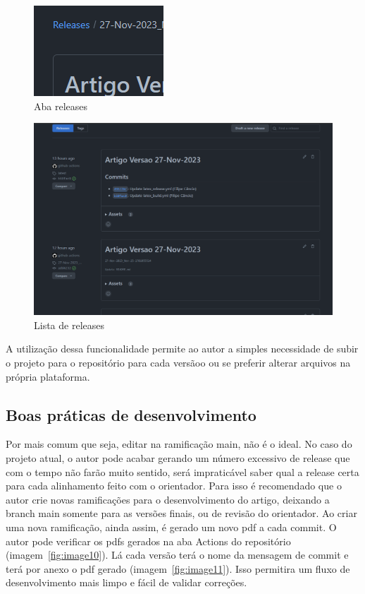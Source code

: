 \begin{figure}[ht]
	\centering
	\includegraphics[width=.5\textwidth]{./images/image08.png}
	\caption{Aba releases}
	\label{fig:image08}
\end{figure}


\begin{figure}[ht]
	\centering
	\includegraphics[width=.5\textwidth]{./images/image09.png}
	\caption{Lista de releases}
	\label{fig:image09}
\end{figure}

A utilização dessa funcionalidade permite ao autor a simples necessidade de subir o projeto para o repositório para cada versãoo ou se preferir alterar arquivos na própria plataforma.

\subsection{Boas práticas de desenvolvimento}

Por mais comum que seja, editar na ramificação main, não é o ideal. No caso do projeto atual, o autor pode acabar gerando um número excessivo de release que com o tempo não farão muito sentido, será impraticável saber qual a release certa para cada alinhamento feito com o orientador. Para isso é recomendado que o autor crie novas ramificações para o desenvolvimento do artigo, deixando a branch main somente para as versões finais, ou de revisão do orientador.
Ao criar uma nova ramificação, ainda assim, é gerado um novo pdf a cada commit. O autor pode verificar os pdfs gerados na aba Actions do repositório (imagem~\ref{fig:image10}). Lá cada versão terá o nome da mensagem de commit e terá por anexo o pdf gerado (imagem~\ref{fig:image11}). Isso permitira um fluxo de desenvolvimento mais limpo e fácil de validar correções.



